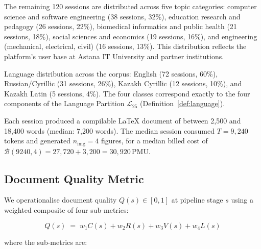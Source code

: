 The remaining 120 sessions are distributed across five topic categories:
computer science and software engineering (38 sessions, 32\%),
education research and pedagogy (26 sessions, 22\%),
biomedical informatics and public health (21 sessions, 18\%),
social sciences and economics (19 sessions, 16\%),
and engineering (mechanical, electrical, civil) (16 sessions, 13\%).
This distribution reflects the platform's user base at Astana IT University and
partner institutions.

Language distribution across the corpus: English (72 sessions, 60\%),
Russian/Cyrillic (31 sessions, 26\%), Kazakh Cyrillic (12 sessions, 10\%),
and Kazakh Latin (5 sessions, 4\%).
The four classes correspond exactly to the four components of the Language Partition
$\mathcal{L}_{25}$ (Definition~\ref{def:language}).

Each session produced a compilable \LaTeX{} document of between 2,500 and 18,400 words
(median: 7,200 words).
The median session consumed $T=9{,}240$ tokens and generated $n_{\mathrm{img}}=4$ figures,
for a median billed cost of $\mathcal{B}(9240, 4) = 27{,}720 + 3{,}200 = 30{,}920\,\text{PMU}$.

\subsection{Document Quality Metric}

We operationalise document quality $Q(s)\in[0,1]$ at pipeline stage $s$ using a
weighted composite of four sub-metrics:

\begin{equation}
  Q(s) \;=\; w_1 C(s) + w_2 R(s) + w_3 V(s) + w_4 L(s)
  \label{eq:quality}
\end{equation}

\noindent where the sub-metrics are:

